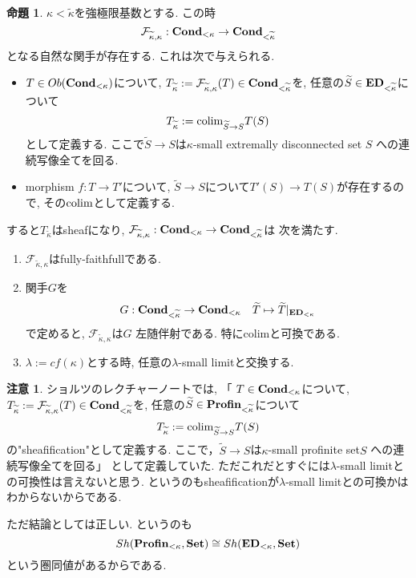 \documentclass[dvipdfmx,a4paper,11pt]{article}
\newcommand{\colim}{{\rm colim}}
\theoremstyle{definition}
\newtheorem{prop}[thm]{命題}
\newtheorem{rem}[thm]{注意}
\begin{document}
   \begin{tcolorbox}
 [colback = white, colframe = green!35!black, fonttitle = \bfseries,breakable = true]
\begin{prop}\cite[Proposition 2.9]{Sch19}
\label{prop-Sch19-2.9}
$\kappa < \widetilde{\kappa}$を強極限基数とする.
この時
$$
\mathcal{F}_{\widetilde{\kappa}, \kappa} : 
{\bf Cond_{<\kappa}} \to {\bf Cond_{<\widetilde{\kappa}}}
$$
となる自然な関手が存在する. 
これは次で与えられる. 
\begin{itemize}
\item $T \in Ob({\bf Cond_{<\kappa}})$について, $T_{\widetilde{\kappa}} :=\mathcal{F}_{\widetilde{\kappa}, \kappa}(T) \in {\bf Cond_{<\widetilde{\kappa}}}$を, 任意の$\widetilde{S} \in {\bf ED}_{< \widetilde{\kappa}}$について
$$
T_{\widetilde{\kappa}} := \colim_{\widetilde{S} \to S} T(S)
$$
として定義する. ここで$\widetilde{S} \to S$は$\kappa$-small extremally disconnected set $S$ への連続写像全てを回る.
\item morphism $f : T \to T'$について, $\widetilde{S} \to S$について$T'(S) \to T(S)$が存在するので, その$\colim$として定義する. 

\end{itemize}
すると$T_{\widetilde{\kappa}} $はsheafになり, $\mathcal{F}_{\widetilde{\kappa}, \kappa} : {\bf Cond_{<\kappa}} \to {\bf Cond_{<\widetilde{\kappa}}}$は
次を満たす.
\begin{enumerate}
\item $\mathcal{F}_{\widetilde{\kappa}, \kappa} $はfully-faithfullである. 
\item 関手$G$を
$$
G : {\bf Cond_{<\widetilde{\kappa}}} \to {\bf Cond_{<\kappa}} 
\quad \widetilde{T} \mapsto \widetilde{T}|_{{\bf ED}_{< \kappa}}
$$
で定めると, 
$\mathcal{F}_{\widetilde{\kappa}, \kappa}$は$G$
左随伴射である. 特にcolimと可換である.
\item $\lambda := cf(\kappa)$とする時, 任意の$\lambda$-small limitと交換する. 
\end{enumerate}
 \end{prop}
 \end{tcolorbox}
 \begin{rem}
 ショルツのレクチャーノートでは, 
「 $T \in {\bf Cond_{<\kappa}} $について, $T_{\widetilde{\kappa}} :=\mathcal{F}_{\widetilde{\kappa}, \kappa}(T) \in {\bf Cond_{<\widetilde{\kappa}}}$を, 任意の$\widetilde{S} \in {\bf Profin}_{< \widetilde{\kappa}}$について
$$
T_{\widetilde{\kappa}} := \colim_{\widetilde{S} \to S} T(S)
$$
の"sheafification"として定義する. ここで，$\widetilde{S} \to S$は$\kappa$-small profinite set$S$ への連続写像全てを回る」
として定義していた.
ただこれだとすぐには$\lambda$-small limitとの可換性は言えないと思う. というのもsheafificationが$\lambda$-small limitとの可換かはわからないからである. 

ただ結論としては正しい. というのも
$$
Sh({\bf Profin}_{<\kappa}, {\bf Set}) \cong Sh({\bf ED}_{<\kappa}, {\bf Set}) 
$$
という圏同値があるからである. 

 \end{rem}
\end{document}
